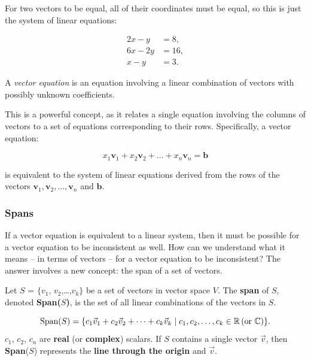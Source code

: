 \documentclass[a4paper,12pt]{article}
\begin{document}
For two vectors to be equal, all of their coordinates must be equal, so this is just the system of linear equations:

\[
\begin{aligned}
2x - y &= 8, \\
6x - 2y &= 16, \\
x - y &= 3.
\end{aligned}
\]
\begin{tcolorbox}[title=Definition,colframe=blue!70!black, colback=blue!5!white]
A \textit{vector equation} is an equation involving a linear combination of vectors with possibly unknown coefficients. 
\end{tcolorbox}
This is a powerful concept, as it relates a single equation involving the columns of vectors to a set of equations corresponding to their rows. Specifically, a vector equation:

\[
x_1 \mathbf{v}_1 + x_2 \mathbf{v}_2 + \dots + x_n \mathbf{v}_n = \mathbf{b}
\]

is equivalent to the system of linear equations derived from the rows of the vectors \(\mathbf{v}_1, \mathbf{v}_2, \dots, \mathbf{v}_n\) and \(\mathbf{b}\).
\subsubsection{Spans}
\small If a vector equation is equivalent to a linear system, then it must be possible for a vector equation to be inconsistent as well.
How can we understand what it means – in terms of vectors – for a vector equation to be inconsistent?
The answer involves a new concept: the span of a set of vectors. \\

\begin{tcolorbox}[title=Definition,colframe=blue!70!black, colback=blue!5!white]
Let \(S\) = \(\{\)\(v_1\), \(v_2\),\dots ,\(v_k\)\(\}\) be a set of vectors in vector space \(V\). The \textbf{span} of \(S\), denoted \textbf{Span(\(S\))}, is the set of all linear combinations of the vectors in \(S\).

\[
    \text{Span}(S) = \{ c_1 \vec{v}_1 + c_2 \vec{v}_2 + \cdots + c_k \vec{v}_k \mid c_1, c_2, \dots, c_k \in \mathbb{R} \, (\text{or } \mathbb{C}) \}.\\
\]
\(c_1\), $c_2$, $c_n$ are \textbf{real} (or \textbf{complex}) scalars.
If $S$ contains a single vector $\vec{v}$, then \textbf{Span}($S$) represents the \textbf{line through the origin} and $\vec{v}$.\\
\end{tcolorbox}
\end{document}
